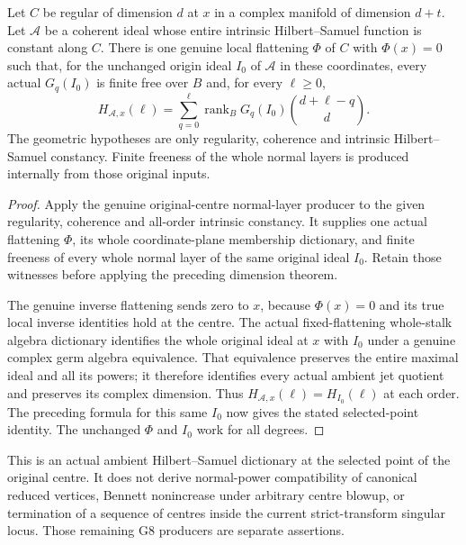 \begin{theorem}
\label{hir:actual-original-hs-constant-centre-ambient-convolution}
\leanok
Let $C$ be regular of dimension $d$ at $x$ in a complex manifold of
dimension $d+t$. Let $\mathcal A$ be a coherent ideal whose entire
intrinsic Hilbert--Samuel function is constant along $C$.
There is one genuine local flattening $\Phi$ of $C$ with $\Phi(x)=0$
such that, for the unchanged origin ideal $I_0$ of $\mathcal A$ in
these coordinates, every actual $G_q(I_0)$ is finite free over $B$
and, for every $\ell\ge0$,
\[
 H_{\mathcal A,x}(\ell)=\sum_{q=0}^{\ell}
   \operatorname{rank}_B G_q(I_0)\binom{d+\ell-q}{d}.
\]
The geometric hypotheses are only regularity, coherence and intrinsic
Hilbert--Samuel constancy. Finite freeness of the whole normal layers
is produced internally from those original inputs.
\end{theorem}
\begin{proof}
Apply the genuine original-centre normal-layer producer to the given
regularity, coherence and all-order intrinsic constancy. It supplies
one actual flattening $\Phi$, its whole coordinate-plane membership
dictionary, and finite freeness of every whole normal layer of the
same original ideal $I_0$. Retain those witnesses before applying
the preceding dimension theorem.

The genuine inverse flattening sends zero to $x$, because $\Phi(x)=0$
and its true local inverse identities hold at the centre. The actual
fixed-flattening whole-stalk algebra dictionary identifies the whole
original ideal at $x$ with $I_0$ under a genuine complex germ algebra
equivalence. That equivalence preserves the entire maximal ideal and
all its powers; it therefore identifies every actual ambient jet
quotient and preserves its complex dimension. Thus
$H_{\mathcal A,x}(\ell)=H_{I_0}(\ell)$ at each order.
The preceding formula for this same $I_0$ now gives the stated
selected-point identity. The unchanged $\Phi$ and $I_0$ work for all
degrees.
\end{proof}

\begin{remark}
This is an actual ambient Hilbert--Samuel dictionary at the selected
point of the original centre. It does not derive normal-power
compatibility of canonical reduced vertices, Bennett nonincrease
under arbitrary centre blowup, or termination of a sequence of
centres inside the current strict-transform singular locus.
Those remaining G8 producers are separate assertions.
\end{remark}
